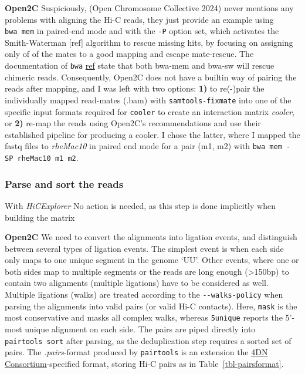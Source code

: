 \documentclass[
  11pt,
  a4paper,
]{scrbook}
\let\oldemph\emph
\renewcommand\emph[1]{\oldemph{\color{gray}#1}}
\begin{document}
\textbf{Open2C} Suspiciously, (Open Chromosome Collective 2024) never
mentions any problems with aligning the Hi-C reads, they just provide an
example using \texttt{bwa\ mem} in paired-end mode and with the
\texttt{-P} option set, which activates the Smith-Waterman {[}ref{]}
algorithm to rescue missing hits, by focusing on assigning only of of
the mates to a good mapping and escape mate-rescue. The documentation of
\texttt{bwa} \href{https://bio-bwa.sourceforge.net}{ref} state that both
bwa-mem and bwa-sw will rescue chimeric reads. Consequently, Open2C does
not have a builtin way of pairing the reads after mapping, and I was
left with two options: \textbf{1)} to re(-)pair the individually mapped
read-mates (.bam) with \texttt{samtools-fixmate} into one of the
specific input formats required for \texttt{cooler} to create an
interaction matrix \emph{cooler}, or \textbf{2)} re-map the reads using
Open2C's recommendations and use their established pipeline for
producing a cooler. I chose the latter, where I mapped the fastq files
to \emph{rheMac10} in paired end mode for a pair (m1, m2) with
\texttt{bwa\ mem\ -SP\ rheMac10\ m1\ m2}.

\subsubsection{Parse and sort the reads}\label{parse-and-sort-the-reads}

With \emph{HiCExplorer} No action is needed, as this step is done
implicitly when building the matrix

\textbf{Open2C} We need to convert the alignments into ligation events,
and distinguish between several types of ligation events. The simplest
event is when each side only maps to one unique segment in the genome
`UU'. Other events, where one or both sides map to multiple segments or
the reads are long enough (\textgreater150bp) to contain two alignments
(multiple ligations) have to be considered as well. Multiple ligations
(walks) are treated according to the \texttt{-\/-walks-policy} when
parsing the alignments into valid pairs (or valid Hi-C contacts). Here,
\texttt{mask} is the most conservative and masks all complex walks,
whereas \texttt{5unique} reports the 5'-most unique alignment on each
side. The pairs are piped directly into \texttt{pairtools\ sort} after
parsing, as the deduplication step requires a sorted set of pairs. The
\emph{.pairs}-format produced by \texttt{pairtools} is an extension the
\href{https://data.4dnucleome.org/file-formats/pairs/}{4DN
Consortium}-specified format, storing Hi-C pairs as in
Table~\ref{tbl-pairsformat}.
\end{document}
